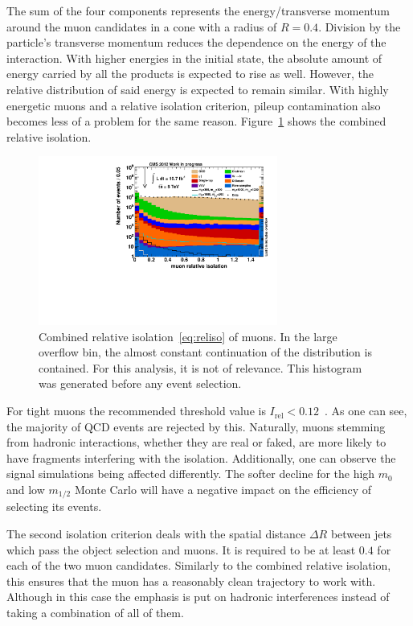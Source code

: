 The sum of the four components represents the energy/transverse momentum around the muon candidates in a cone with a radius of $R = 0.4$. Division by the particle's transverse momentum reduces the dependence on the energy of the interaction. With higher energies in the initial state, the absolute amount of energy carried by all the products is expected to rise as well. However, the relative distribution of said energy is expected to remain similar. With highly energetic muons and a relative isolation criterion, pileup contamination also becomes less of a problem for the same reason. Figure~\ref{fig:reliso} shows the combined relative isolation.

\begin{figure}[ht!]
  \centering
    \includegraphics[width=0.7\textwidth]{plots/reliso.pdf}
  \caption{Combined relative isolation~\ref{eq:reliso} of muons. In the large overflow bin, the almost constant continuation of the distribution is contained. For this analysis, it is not of relevance. This histogram was generated before any event selection.}
  \label{fig:reliso}
\end{figure}

\noindent For tight muons the recommended threshold value is $I_{\text{rel}} < 0.12$~\cite{muonpog}. As one can see, the majority of QCD events are rejected by this. Naturally, muons stemming from hadronic interactions, whether they are real or faked, are more likely to have fragments interfering with the isolation. Additionally, one can observe the signal simulations being affected differently. The softer decline for the high $m_0$ and low $m_{1/2}$ Monte Carlo will have a negative impact on the efficiency of selecting its events.

The second isolation criterion deals with the spatial distance $\Delta R$ between jets which pass the object selection and muons. It is required to be at least $0.4$ for each of the two muon candidates. Similarly to the combined relative isolation, this ensures that the muon has a reasonably clean trajectory to work with. Although in this case the emphasis is put on hadronic interferences instead of taking a combination of all of them.

